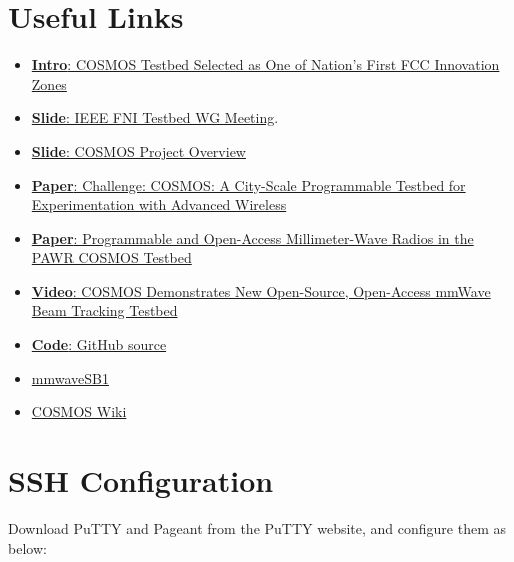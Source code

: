 \documentclass{article}
\begin{document}
\section{Useful Links}
    \begin{itemize}
        \item \href{https://www.engineering.columbia.edu/news/cosmos-fcc-innovation-zone}{\textbf{Intro}: COSMOS Testbed Selected as One of Nation’s First FCC Innovation Zones}
        
        \item \href{https://futurenetworks.ieee.org/images/files/pdf/2021-03-26_IEEE_FNI_INGR_Testbed_WG_-_COSMOS.pdf}{\textbf{Slide}: IEEE FNI Testbed WG Meeting}. 
        
        \item \href{https://www.advancedwireless.org/wp-content/uploads/2018/05/COSMOS-Overview-2018.pdf}{\textbf{Slide}: COSMOS	Project	Overview}
        
        \item \href{https://www.researchgate.net/publication/339227709_Challenge_COSMOS_A_City-Scale_Programmable_Testbed_for_Experimentation_with_Advanced_Wireless}{\textbf{Paper}: Challenge: COSMOS: A City-Scale Programmable Testbed for Experimentation with Advanced Wireless}
        
        \item \href{https://dl.acm.org/doi/10.1145/3477086.3480834}{\textbf{Paper}: Programmable and Open-Access Millimeter-Wave Radios in the PAWR COSMOS Testbed}
        
        \item \href{https://www.youtube.com/watch?v=-tmH6C33Cl0&ab_channel=COSMOS}{\textbf{Video}: COSMOS Demonstrates New Open-Source, Open-Access mmWave Beam Tracking Testbed}
        
        \item \href{https://github.com/nyu-wireless/mmwsdr}{\textbf{Code}: GitHub source}
        
        \item \href{https://wiki.cosmos-lab.org/wiki/Tutorials/Wireless/mmwaveSB1}{mmwaveSB1}
        
        \item \href{https://wiki.cosmos-lab.org/wiki/WikiStart#COSMOSTestbedOverview}{COSMOS Wiki}
    \end{itemize}


\section{SSH Configuration}
    Download PuTTY and Pageant from the PuTTY website, and configure them as below:
    
\end{document}
